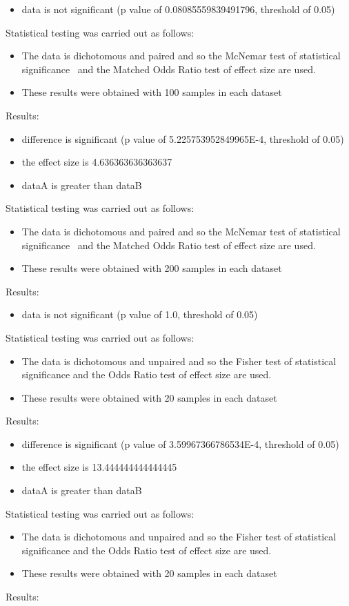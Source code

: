 \documentclass[]{article}
\begin{document}
\begin{itemize}
\item{data is not significant (p value of 0.08085559839491796, threshold of 0.05)}
\end{itemize}Statistical testing was carried out as follows: \begin{itemize}
\item{The data is dichotomous and paired and so the McNemar test of statistical significance~\cite{Gibbons2011} and the Matched Odds Ratio test of effect size are used.}
\item{These results were obtained with 100 samples in each dataset}
\end{itemize}Results:
\begin{itemize}
\item{difference is significant (p value of 5.225753952849965E-4, threshold of 0.05)}
\item{the effect size is 4.636363636363637}
\item{dataA is greater than dataB}
\end{itemize}Statistical testing was carried out as follows: \begin{itemize}
\item{The data is dichotomous and paired and so the McNemar test of statistical significance~\cite{Gibbons2011} and the Matched Odds Ratio test of effect size are used.}
\item{These results were obtained with 200 samples in each dataset}
\end{itemize}Results:
\begin{itemize}
\item{data is not significant (p value of 1.0, threshold of 0.05)}
\end{itemize}Statistical testing was carried out as follows: \begin{itemize}
\item{The data is dichotomous and unpaired and so the Fisher test of statistical significance and the Odds Ratio test of effect size are used.}
\item{These results were obtained with 20 samples in each dataset}
\end{itemize}Results:
\begin{itemize}
\item{difference is significant (p value of 3.59967366786534E-4, threshold of 0.05)}
\item{the effect size is 13.444444444444445}
\item{dataA is greater than dataB}
\end{itemize}Statistical testing was carried out as follows: \begin{itemize}
\item{The data is dichotomous and unpaired and so the Fisher test of statistical significance and the Odds Ratio test of effect size are used.}
\item{These results were obtained with 20 samples in each dataset}
\end{itemize}Results:
\end{document}
